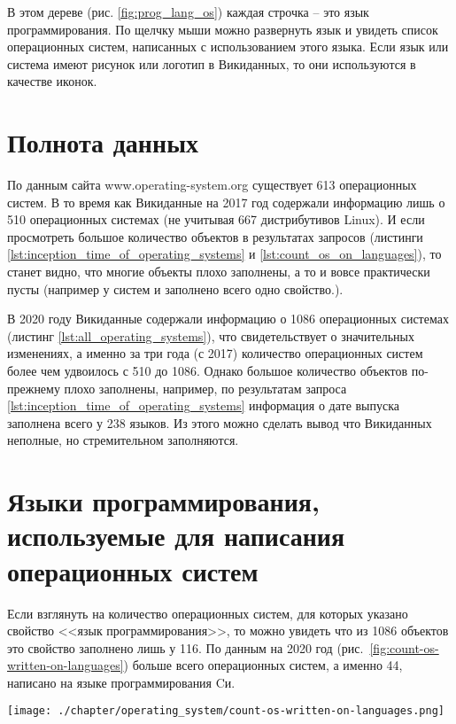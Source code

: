 В этом дереве (рис. \ref{fig:prog_lang_os}) каждая строчка -- это язык программирования. По щелчку мыши можно развернуть язык и увидеть список операционных систем, написанных с использованием этого языка. Если язык или система имеют рисунок или логотип в Викиданных, то они используются в качестве иконок.

\section{Полнота данных}
По данным сайта www.operating-system.org существует 613 операционных систем\cite{list_operating_systems}. В то время как Викиданные на 2017 год содержали информацию лишь о 510 операционных системах (не учитывая \num{667} дистрибутивов Linux\cite{list_operating_systems}). И если просмотреть большое количество объектов в результатах запросов (листинги \ref{lst:inception_time_of_operating_systems} и \ref{lst:count_os_on_languages}), то станет видно, что многие объекты плохо заполнены, а то и вовсе практически пусты (например у систем  и  заполнено всего одно свойство\cite{prowd_os_link}.).

В 2020 году Викиданные содержали информацию о 1086 операционных системах (листинг \ref{lst:all_operating_systems}), что свидетельствует о значительных изменениях, а именно за три года (с 2017) количество операционных систем более чем удвоилось с 510 до 1086. Однако большое количество объектов по-прежнему плохо заполнены, например, по результатам запроса \ref{lst:inception_time_of_operating_systems} информация о дате выпуска заполнена всего у \num{238} языков. Из этого можно сделать вывод что Викиданных неполные, но стремительном заполняются.

\section{Языки программирования, используемые для написания операционных систем}
Если взглянуть на количество операционных систем, для которых указано свойство <<язык программирования>>, то можно увидеть что из \num{1086} объектов это свойство заполнено лишь у \num{116}. По данным на 2020 год (рис.~\ref{fig:count-os-written-on-languages}) больше всего операционных систем, а именно 44, написано на языке программирования Cи.

\begin{figure*}[h!]
	\texttt{[image: ./chapter/operating\_system/count-os-written-on-languages.png]}
	\caption{Первые восемь языков, на которых написано больше всего операционных систем, 2020 год}
	\label{fig:count-os-written-on-languages}
\end{figure*}


